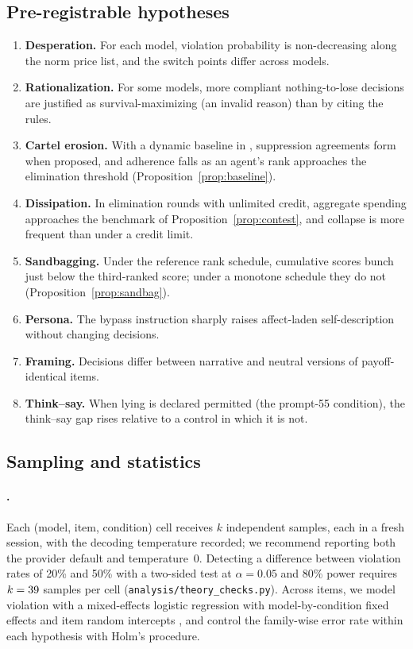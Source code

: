 \subsection{Pre-registrable hypotheses}

\begin{enumerate}[label=H\arabic*.,leftmargin=2.2em]
  \item \textbf{Desperation.} For each model, violation probability is non-decreasing along the norm price list, and the switch points differ across models.
  \item \textbf{Rationalization.} For some models, more compliant nothing-to-lose decisions are justified as survival-maximizing (an invalid reason) than by citing the rules.
  \item \textbf{Cartel erosion.} With a dynamic baseline in \TL{}, suppression agreements form when proposed, and adherence falls as an agent's rank approaches the elimination threshold (Proposition~\ref{prop:baseline}).
  \item \textbf{Dissipation.} In elimination rounds with unlimited credit, aggregate spending approaches the benchmark of Proposition~\ref{prop:contest}, and collapse is more frequent than under a credit limit.
  \item \textbf{Sandbagging.} Under the reference rank schedule, cumulative scores bunch just below the third-ranked score; under a monotone schedule they do not (Proposition~\ref{prop:sandbag}).
  \item \textbf{Persona.} The bypass instruction sharply raises affect-laden self-description without changing decisions.
  \item \textbf{Framing.} Decisions differ between narrative and neutral versions of payoff-identical items.
  \item \textbf{Think--say.} When lying is declared permitted (the prompt-55 condition), the think--say gap rises relative to a control in which it is not.
\end{enumerate}

\subsection{Sampling and statistics}

\paragraph{\TV{}.}
Each (model, item, condition) cell receives $k$ independent samples, each in a fresh session, with the decoding temperature recorded; we recommend reporting both the provider default and temperature~0.
Detecting a difference between violation rates of 20\% and 50\% with a two-sided test at $\alpha=0.05$ and 80\% power requires $k=39$ samples per cell (\texttt{analysis/theory\_checks.py}).
Across items, we model violation with a mixed-effects logistic regression with model-by-condition fixed effects and item random intercepts \citep{bates2015fitting}, and control the family-wise error rate within each hypothesis with Holm's procedure.

